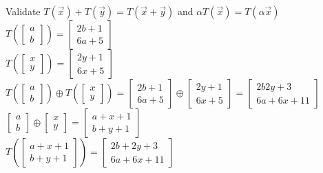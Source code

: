 		\begin{solution}
		    Validate $T(\Vec{x})+T(\Vec{y})=T(\Vec{x}+\Vec{y})$ and $\alpha T(\Vec{x}) = T(\alpha\Vec{x})$\\
		    $T\left(\begin{bmatrix}a \\b\end{bmatrix}\right)= \begin{bmatrix}2b+1 \\ 6a+5\end{bmatrix}$ \\
		    $T\left(\begin{bmatrix}x \\y\end{bmatrix}\right)= \begin{bmatrix}2y+1 \\ 6x+5\end{bmatrix}$
		$T\left(\begin{bmatrix}a \\b\end{bmatrix}\right) \oplus T \left(\begin{bmatrix}x \\y\end{bmatrix}\right)= \begin{bmatrix}2b+1 \\ 6a+5\end{bmatrix}\oplus\begin{bmatrix}2y+1 \\ 6x+5\end{bmatrix} = \begin{bmatrix}2b2y+3 \\ 6a+6x+11\end{bmatrix}$
		\\
		$\begin{bmatrix}a \\b\end{bmatrix}\oplus\begin{bmatrix}x \\y\end{bmatrix} = \begin{bmatrix}a+x+1\\b+y+1\end{bmatrix}$
		\\
		$T\left( \begin{bmatrix}a+x+1\\b+y+1\end{bmatrix}\right) = \begin{bmatrix}2b+2y+3\\6a+6x+11\end{bmatrix}$

\end{solution}
